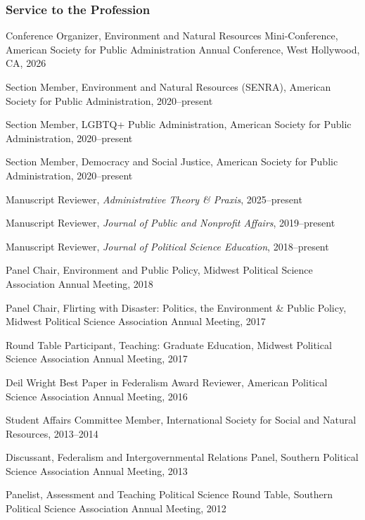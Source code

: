 \documentclass[11pt,letterpaper]{article}
\renewenvironment{itemize}{
  \begin{list}{}{
    \setlength{\leftmargin}{1.5em}
    \setlength{\itemsep}{0.25em}
    \setlength{\parskip}{0pt}
    \setlength{\parsep}{0.25em}
  }
}{
  \end{list}
}
\begin{document}
\subsubsection*{Service to the Profession}
\begin{itemize}\leftmargin=2pt\itemindent=-15pt
    \item Conference Organizer, Environment and Natural Resources Mini-Conference, American Society for Public Administration Annual Conference, West Hollywood, CA, 2026
    \item Section Member, Environment and Natural Resources (SENRA), American Society for Public Administration, 2020--present
    \item Section Member, LGBTQ+ Public Administration, American Society for Public Administration, 2020--present
    \item Section Member, Democracy and Social Justice, American Society for Public Administration, 2020--present
    \item Manuscript Reviewer, \emph{Administrative Theory \& Praxis}, 2025--present
    \item Manuscript Reviewer, \emph{Journal of Public and Nonprofit Affairs}, 2019--present
    \item Manuscript Reviewer, \emph{Journal of Political Science Education}, 2018--present
    \item Panel Chair, Environment and Public Policy, Midwest Political Science Association Annual Meeting, 2018
    \item Panel Chair, Flirting with Disaster: Politics, the Environment \& Public Policy, Midwest Political Science Association Annual Meeting, 2017
    \item Round Table Participant, Teaching: Graduate Education, Midwest Political Science Association Annual Meeting, 2017
    \item Deil Wright Best Paper in Federalism Award Reviewer, American Political Science Association Annual Meeting, 2016
    \item Student Affairs Committee Member, International Society for Social and Natural Resources, 2013--2014
    \item Discussant, Federalism and Intergovernmental Relations Panel, Southern Political Science Association Annual Meeting, 2013
    \item Panelist, Assessment and Teaching Political Science Round Table, Southern Political Science Association Annual Meeting, 2012
\end{itemize}
\end{document}
